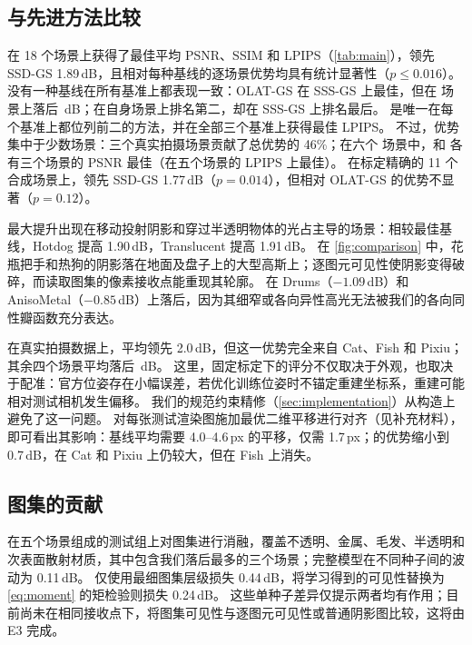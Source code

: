 \subsection{与先进方法比较}
\label{sec:exp_main}
\ours 在 18 个场景上获得了最佳平均 PSNR、SSIM 和 LPIPS（\cref{tab:main}），领先 SSD-GS 1.89\,dB，且相对每种基线的逐场景优势均具有统计显著性（$p\le0.016$）。
没有一种基线在所有基准上都表现一致：OLAT-GS 在 SSS-GS 上最佳，但在 \gsthree 场景上落后 \,dB；\gsthree 在自身场景上排名第二，却在 SSS-GS 上排名最后。
\ours 是唯一在每个基准上都位列前二的方法，并在全部三个基准上获得最佳 LPIPS。
不过，优势集中于少数场景：三个真实拍摄场景贡献了总优势的 46\%；在六个 \gsthree 场景中，\ours 和 \gsthree 各有三个场景的 PSNR 最佳（\ours 在五个场景的 LPIPS 上最佳）。
在标定精确的 11 个合成场景上，\ours 领先 SSD-GS 1.77\,dB（$p=0.014$），但相对 OLAT-GS 的优势不显著（$p=0.12$）。

最大提升出现在移动投射阴影和穿过半透明物体的光占主导的场景：相较最佳基线，Hotdog 提高 1.90\,dB，Translucent 提高 1.91\,dB。
在 \cref{fig:comparison} 中，花瓶把手和热狗的阴影落在地面及盘子上的大型高斯上；逐图元可见性使阴影变得破碎，而读取图集的像素接收点能重现其轮廓。
\ours 在 Drums（$-1.09$\,dB）和 AnisoMetal（$-0.85$\,dB）上落后，因为其细窄或各向异性高光无法被我们的各向同性瓣函数充分表达。

在真实拍摄数据上，\ours 平均领先 2.0\,dB，但这一优势完全来自 Cat、Fish 和 Pixiu；其余四个场景平均落后 \,dB。
这里，固定标定下的评分不仅取决于外观，也取决于配准：官方位姿存在小幅误差，若优化训练位姿时不锚定重建坐标系，重建可能相对测试相机发生偏移。
我们的规范约束精修（\cref{sec:implementation}）从构造上避免了这一问题。
对每张测试渲染图施加最优二维平移进行对齐（见补充材料），即可看出其影响：基线平均需要 4.0--4.6\,px 的平移，\ours 仅需 1.7\,px；\ours 的优势缩小到 0.7\,dB，在 Cat 和 Pixiu 上仍较大，但在 Fish 上消失。



\subsection{图集的贡献}
\label{sec:exp_atlas}
 在五个场景组成的测试组上对图集进行消融，覆盖不透明、金属、毛发、半透明和次表面散射材质，其中包含我们落后最多的三个场景；完整模型在不同种子间的波动为 0.11\,dB。
仅使用最细图集层级损失 0.44\,dB，将学习得到的可见性替换为 \cref{eq:moment} 的矩检验则损失 0.24\,dB。
这些单种子差异仅提示两者均有作用；目前尚未在相同接收点下，将图集可见性与逐图元可见性或普通阴影图比较，这将由 E3 完成。

